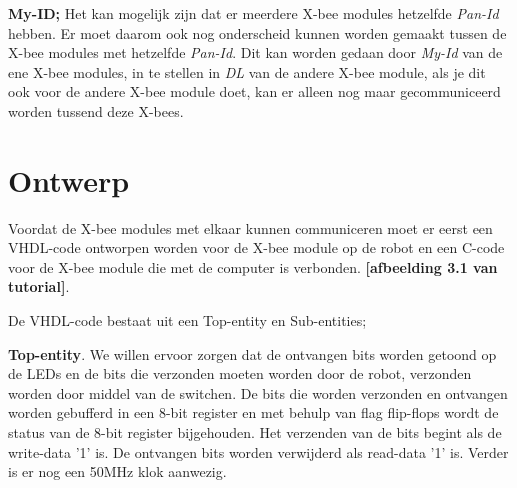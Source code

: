 \documentclass{report}
\begin{document}
\textbf{My-ID;}
\newline
Het kan mogelijk zijn dat er meerdere X-bee modules hetzelfde\textit{ Pan-Id} hebben. Er moet daarom ook nog onderscheid kunnen worden gemaakt tussen de X-bee modules met hetzelfde \textit{Pan-Id}. Dit kan worden gedaan door \textit{My-Id} van de ene X-bee modules, in te stellen in \textit{DL} van de andere X-bee module, als je dit ook voor de andere X-bee module doet, kan er alleen nog maar gecommuniceerd worden tussend deze X-bees.


\section{Ontwerp}
Voordat de X-bee modules met elkaar kunnen communiceren moet er eerst een VHDL-code ontworpen worden voor de X-bee module op de robot en een C-code voor de X-bee module die met de computer is verbonden.
\textbf{[afbeelding 3.1 van tutorial]}.
\newline

De VHDL-code bestaat uit een Top-entity en Sub-entities;
\newline

\textbf{Top-entity}.
\newline
We willen ervoor zorgen dat de ontvangen bits worden getoond op de LEDs en de bits die verzonden moeten worden door de robot, verzonden worden door middel van de switchen. De bits die worden verzonden en ontvangen worden gebufferd in een 8-bit register en met behulp van flag flip-flops wordt de status van de 8-bit register bijgehouden. Het verzenden van de bits begint als de write-data '1' is. De ontvangen bits worden verwijderd als read-data '1' is. Verder is er nog een 50MHz klok aanwezig.
\newline
\end{document}
